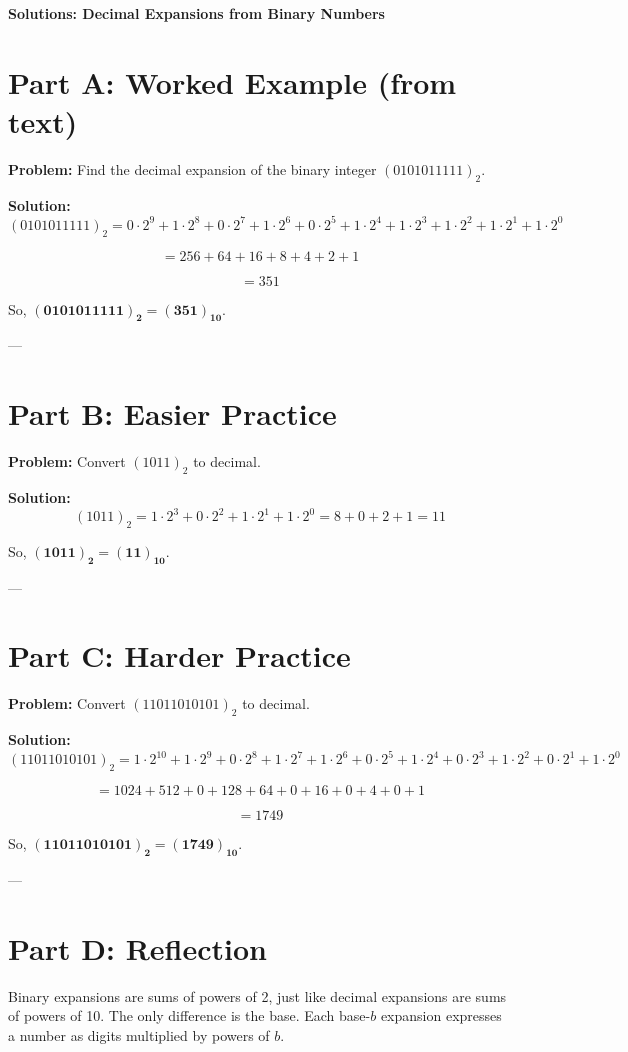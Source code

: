 \documentclass[12pt]{article}
\begin{document}
\begin{center}
\Large\textbf{Solutions: Decimal Expansions from Binary Numbers}
\end{center}

\section*{Part A: Worked Example (from text)}

\textbf{Problem:} Find the decimal expansion of the binary integer $(0101011111)_2$.

\textbf{Solution:} 
\[
(0101011111)_2 = 0 \cdot 2^9 + 1 \cdot 2^8 + 0 \cdot 2^7 + 1 \cdot 2^6 + 0 \cdot 2^5
+ 1 \cdot 2^4 + 1 \cdot 2^3 + 1 \cdot 2^2 + 1 \cdot 2^1 + 1 \cdot 2^0
\]

\[
= 256 + 64 + 16 + 8 + 4 + 2 + 1
\]

\[
= 351
\]

So, \(\mathbf{(0101011111)_2 = (351)_{10}}\).

---

\section*{Part B: Easier Practice}

\textbf{Problem:} Convert $(1011)_2$ to decimal.  

\textbf{Solution:} 
\[
(1011)_2 = 1 \cdot 2^3 + 0 \cdot 2^2 + 1 \cdot 2^1 + 1 \cdot 2^0
= 8 + 0 + 2 + 1 = 11
\]

So, \(\mathbf{(1011)_2 = (11)_{10}}\).

---

\section*{Part C: Harder Practice}

\textbf{Problem:} Convert $(11011010101)_2$ to decimal.  

\textbf{Solution:} 
\[
(11011010101)_2 = 1 \cdot 2^{10} + 1 \cdot 2^9 + 0 \cdot 2^8 + 1 \cdot 2^7 + 1 \cdot 2^6 
+ 0 \cdot 2^5 + 1 \cdot 2^4 + 0 \cdot 2^3 + 1 \cdot 2^2 + 0 \cdot 2^1 + 1 \cdot 2^0
\]

\[
= 1024 + 512 + 0 + 128 + 64 + 0 + 16 + 0 + 4 + 0 + 1
\]

\[
= 1749
\]

So, \(\mathbf{(11011010101)_2 = (1749)_{10}}\).

---

\section*{Part D: Reflection}

Binary expansions are sums of powers of 2, just like decimal expansions are sums of powers of 10. The only difference is the base. Each base-$b$ expansion expresses a number as digits multiplied by powers of $b$.
\end{document}
